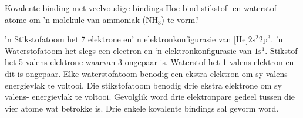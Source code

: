     \noindent
\par \vspace{-2cm}
\begin{wex}{Kovalente binding met veelvoudige bindings }{
Hoe bind stikstof- en waterstof- atome om 'n molekule van ammoniak ($\text{NH}{}_{3}$) te vorm? 
}
{
'n Stikstofatoom  het 7 elektrone en' n elektronkonfigurasie van $\text{[He]}2\text{s}^{2}2\text{p}^{3}$. 'n Waterstofatoom het slegs een electron en ‘n elektronkonfigurasie van $1\text{s}^{1}$.
Stikstof het 5 valens-elektrone waarvan 3 ongepaar is. Waterstof het 1 valens-elektron en dit is ongepaar.
Elke waterstofatoom benodig een ekstra elektron om sy valens-energievlak te voltooi. Die stikstofatoom benodig drie ekstra elektrone om sy valens- energievlak te voltooi. Gevolglik word drie elektronpare gedeel tussen die vier atome wat betrokke is. Drie enkele kovalente bindings sal gevorm word. 
    \setcounter{subfigure}{0}
\begin{figure}[H]
\end{figure}
 
}
\end{wex}
